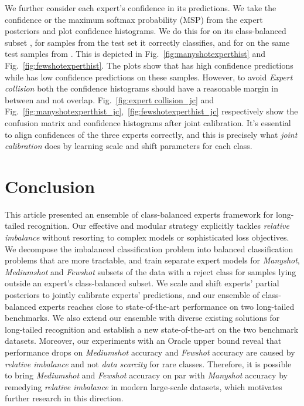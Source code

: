 \documentclass[runningheads]{llncs}
\begin{document}
\par We further consider each expert's confidence in its predictions. We take the confidence or the maximum softmax probability (MSP) from the expert posteriors and plot confidence histograms. We do this for  on its class-balanced subset , for samples from the test set it correctly classifies, and for  on the same test samples from . This is depicted in Fig.~\ref{fig:manyshotexperthist} and Fig.~\ref{fig:fewshotexperthist}. The plots show that  has high confidence predictions while  has low confidence predictions on these samples. However, to avoid \emph{Expert collision} both the confidence histograms should have a reasonable margin in between and not overlap. Fig.~\ref{fig:expert collision_jc} and Fig.~\ref{fig:manyshotexperthist_jc},~\ref{fig:fewshotexperthist_jc} respectively show the confusion matrix and confidence histograms after joint calibration. It's essential to align confidences of the three experts correctly, and this is precisely what \emph{joint calibration} does by learning scale and shift parameters for each class. 
\section{Conclusion}
This article presented an ensemble of class-balanced experts framework for long-tailed recognition. Our effective and modular strategy explicitly tackles \emph{relative imbalance} without resorting to complex models or sophisticated loss objectives. We decompose the imbalanced classification problem into balanced classification problems that are more tractable, and train separate expert models for \emph{Manyshot}, \emph{Mediumshot} and \emph{Fewshot} subsets of the data with a reject class for samples lying outside an expert's class-balanced subset. We scale and shift experts' partial posteriors to jointly calibrate experts' predictions, and our ensemble of class-balanced experts reaches close to state-of-the-art performance on two long-tailed benchmarks. We also extend our ensemble with diverse existing solutions for long-tailed recognition and establish a new state-of-the-art on the two benchmark datasets. Moreover, our experiments with an Oracle upper bound reveal that performance drops on \emph{Mediumshot} accuracy and \emph{Fewshot} accuracy are caused by \emph{relative imbalance} and not \emph{data scarcity} for rare classes. Therefore, it is possible to bring \emph{Mediumshot} and \emph{Fewshot} accuracy on par with \emph{Manyshot} accuracy by remedying \emph{relative imbalance} in modern large-scale datasets, which motivates further research in this direction.  




\end{document}
